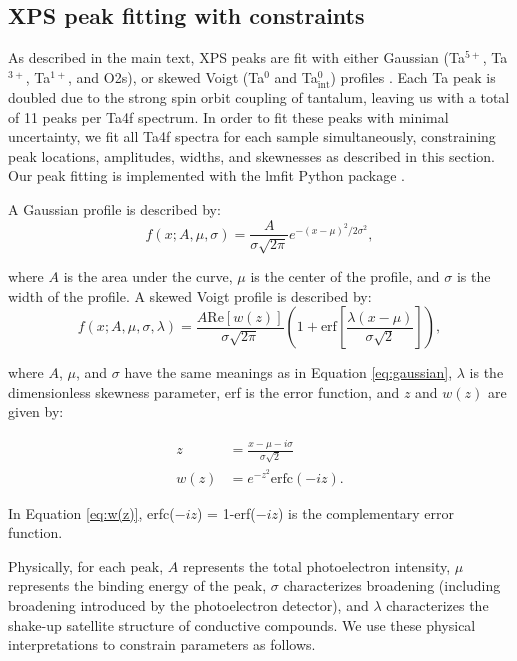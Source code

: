 \documentclass{WileyMSP-template}
\begin{document}
\subsection{XPS peak fitting with constraints} 

As described in the main text, XPS peaks are fit with either Gaussian (Ta$^{5+}$, Ta$^{3+}$, Ta$^{1+}$, and O2s), or skewed Voigt (Ta$^0$ and Ta$^0_{\text{int}}$) profiles \cite{engelhard_introductory_2020}. Each Ta peak is doubled due to the strong spin orbit coupling of tantalum, leaving us with a total of 11 peaks per Ta4f spectrum. In order to fit these peaks with minimal uncertainty, we fit all Ta4f spectra for each sample simultaneously, constraining peak locations, amplitudes, widths, and skewnesses as described in this section. Our peak fitting is implemented with the lmfit Python package \cite{noauthor_getting_nodate}.

A Gaussian profile is described by:
\begin{equation}\label{eq:gaussian}
    f(x;A,\mu,\sigma) = \frac{A}{\sigma{}\sqrt{2\pi{}}}e^{-(x-\mu{})^2/2\sigma^2},
\end{equation}

where $A$ is the area under the curve, $\mu$ is the center of the profile, and $\sigma$ is the width of the profile. A skewed Voigt profile is described by:
\begin{equation}\label{eq:voigt}
    f(x;A,\mu,\sigma,\lambda) = \frac{A \text{Re}[w(z)]}{\sigma{}\sqrt{2\pi{}}}\left(1+\text{erf}\left[\frac{\lambda(x-\mu)}{\sigma\sqrt{2}} \right] \right),
\end{equation}

where $A$, $\mu$, and $\sigma$ have the same meanings as in Equation \ref{eq:gaussian}, $\lambda$ is the dimensionless skewness parameter, erf is the error function, and $z$ and $w(z)$ are given by:

\begin{align}
    z & = \frac{x-\mu-i\sigma}{\sigma\sqrt{2}} \\
    w(z) & = e^{-z^2}\text{erfc}(-iz). \label{eq:w(z)}
\end{align}

In Equation \ref{eq:w(z)}, erfc($-iz$) = 1-erf($-iz$) is the complementary error function.

Physically, for each peak, $A$ represents the total photoelectron intensity, $\mu$ represents the binding energy of the peak, $\sigma$ characterizes broadening (including broadening introduced by the photoelectron detector), and $\lambda$ characterizes the shake-up satellite structure of conductive compounds. We use these physical interpretations to constrain parameters as follows.
\end{document}
